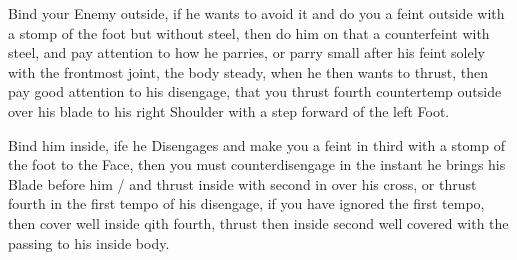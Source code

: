 \newpage


\newpage


\exercise{}


Bind your Enemy outside, if he wants to avoid it and do you a feint
outside with a stomp of the foot but without steel, then do him on
that a counterfeint with steel, and pay attention to how he parries,
or parry small after his feint solely with the frontmost joint, the
body steady, when he then wants to thrust, then pay good attention to
his disengage, that you thrust fourth countertemp outside over his
blade to his right Shoulder with a step forward of the left Foot.

\exercise{}

Bind him inside, ife he Disengages and make you a feint in third with
a stomp of the foot to the Face, then you must counterdisengage in the
instant he brings his Blade before him / and thrust inside with second
in over his cross, or thrust fourth in the first tempo of his
disengage, if you have ignored the first tempo, then cover well inside
qith fourth, thrust then inside second well covered with the passing
to his inside body.

\exercise{}

